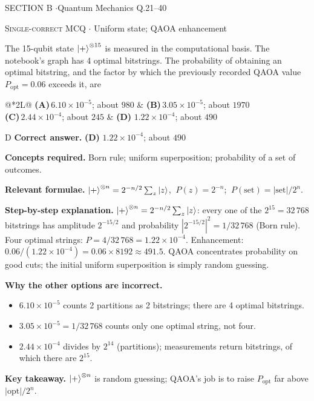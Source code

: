 \documentclass[11pt,a4paper]{article}
\newcommand{\optlabel}[1]{\textbf{(#1)}}
\newcommand{\correctlabel}[1]{\textcolor{okgreen}{\textbf{(#1)}\,\ding{51}}}
\newenvironment{qitem}[1]{\begin{list}{}{\setlength{\leftmargin}{3.3em}\setlength{\labelwidth}{3.1em}%
  \setlength{\labelsep}{0.2em}\setlength{\topsep}{3pt}\setlength{\parsep}{3pt}}\item[\textbf{Q.#1}\hfill]}{\end{list}}
\newcommand{\qsep}{\par\vspace{2pt}{\color{black!15}\hrule}\vspace{4pt}}
\newcommand{\qmeta}[2]{{\footnotesize\color{black!60}\textsc{#1} \;$\cdot$\; #2}\par}
\begin{document}
\newpage

\begin{sectionbanner}SECTION B \enspace$\cdot$\enspace Quantum Mechanics \hfill Q.21--40\end{sectionbanner}

\begin{qitem}{21}
\qmeta{Single-correct MCQ}{Uniform state; QAOA enhancement}
The 15-qubit state $\ket{+}^{\otimes 15}$ is measured in the computational basis. The notebook's graph has 4 optimal
bitstrings. The probability of obtaining an optimal bitstring, and the factor by which the previously recorded QAOA value
$P_{\text{opt}} = 0.06$ exceeds it, are
\par\smallskip\noindent\begin{tabularx}{\linewidth}{@{}*{2}{L}@{}}
\optlabel{A}\,$6.10\times10^{-5}$; about $980$ & \optlabel{B}\,$3.05\times10^{-5}$; about $1970$ \\[3pt]
\optlabel{C}\,$2.44\times10^{-4}$; about $245$ & \correctlabel{D}\,$1.22\times10^{-4}$; about $490$
\end{tabularx}
\end{qitem}
\begin{solbox}{D}
\textbf{\color{brand}Correct answer.} \textcolor{okgreen}{\textbf{(D)}} $1.22\times10^{-4}$; about $490$

\textbf{\color{brand}Concepts required.} Born rule; uniform superposition; probability of a set of outcomes.

\textbf{\color{brand}Relevant formulae.} $\ket+^{\otimes n} = 2^{-n/2}\sum_z\ket z$, $\ P(z) = 2^{-n}$; $\ P(\text{set}) = |\text{set}|/2^n$.

\textbf{\color{brand}Step-by-step explanation.} $\ket{+}^{\otimes n} = 2^{-n/2}\sum_z \ket z$: every one of the $2^{15} = 32\,768$ bitstrings has amplitude $2^{-15/2}$ and
probability $|2^{-15/2}|^2 = 1/32\,768$ (Born rule). Four optimal strings: $P = 4/32\,768 = 1.22\times10^{-4}$.
Enhancement: $0.06 / (1.22\times10^{-4}) = 0.06 \times 8192 \approx 491.5$. QAOA concentrates probability on good cuts;
the initial uniform superposition is simply random guessing.

\textbf{\color{brand}Why the other options are incorrect.}
\begin{itemize}[leftmargin=2.4em, itemsep=1pt, topsep=2pt]
\item[\textbf{(A)}] $6.10\times10^{-5}$ counts 2 partitions as 2 bitstrings; there are 4 optimal bitstrings.
\item[\textbf{(B)}] $3.05\times10^{-5} = 1/32\,768$ counts only one optimal string, not four.
\item[\textbf{(C)}] $2.44\times10^{-4}$ divides by $2^{14}$ (partitions); measurements return bitstrings, of which there are $2^{15}$.
\end{itemize}
\textbf{\color{brand}Key takeaway.} $\ket+^{\otimes n}$ is random guessing; QAOA's job is to raise $P_{\text{opt}}$ far above $|\text{opt}|/2^n$.
\end{solbox}
\qsep
\end{document}
